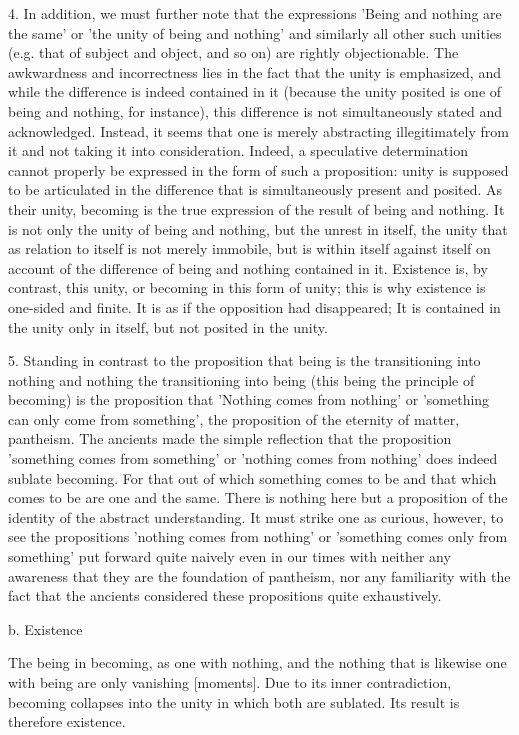 4. In addition, we must further note that the expressions
'Being and nothing are the same' or
'the unity of being and nothing' and
similarly all other such unities
(e.g. that of subject and object, and so on)
are rightly objectionable.
The awkwardness and incorrectness lies in
the fact that the unity is emphasized,
and while the difference is indeed contained in it
(because the unity posited is one of being and nothing, for instance),
this difference is not simultaneously stated and acknowledged.
Instead, it seems that one is merely
abstracting illegitimately from it
and not taking it into consideration.
Indeed, a speculative determination cannot properly be
expressed in the form of such a proposition:
unity is supposed to be articulated in the difference
that is simultaneously present and posited.
As their unity, becoming is the true expression of
the result of being and nothing.
It is not only the unity of being and nothing,
but the unrest in itself,
the unity that as relation to itself is
not merely immobile,
but is within itself against itself
on account of the difference of
being and nothing contained in it.
Existence is, by contrast, this unity, or
becoming in this form of unity;
this is why existence is one-sided and finite.
It is as if the opposition had disappeared;
It is contained in the unity only in itself,
but not posited in the unity.

5. Standing in contrast to the proposition
that being is the transitioning into nothing and
nothing the transitioning into being
(this being the principle of becoming)
is the proposition that 'Nothing comes from nothing'
or 'something can only come from something',
the proposition of the eternity of matter, pantheism.
The ancients made the simple reflection that the proposition
'something comes from something' or
'nothing comes from nothing'
does indeed sublate becoming.
For that out of which something comes to be and
that which comes to be are one and the same.
There is nothing here but a proposition of
the identity of the abstract understanding.
It must strike one as curious, however, to see the propositions
'nothing comes from nothing' or 'something comes only from something'
put forward quite naively even in our times
with neither any awareness that they are the foundation of pantheism,
nor any familiarity with the fact that the ancients
considered these propositions quite exhaustively.

b. Existence

The being in becoming,
as one with nothing,
and the nothing that is
likewise one with being
are only vanishing [moments].
Due to its inner contradiction,
becoming collapses into the unity
in which both are sublated.
Its result is therefore existence.

